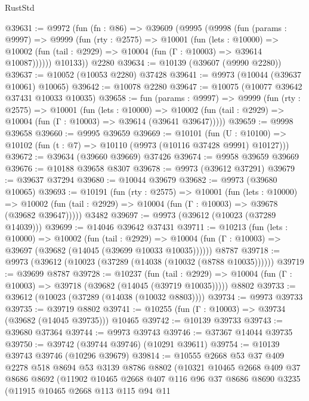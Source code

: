 \begin{lexlean}{RustStd}
\begin{coremodule}
@39631 := @9972
    (fun (fn : @86) =>
    @39609
      (@9995
        (@9998
          (fun (params : @9997) =>
          @9999
            (fun (rty : @2575) =>
            @10001
              (fun (lets : @10000) =>
              @10002 (fun (tail : @2929) => @10004 (fun (Γ : @10003) => @39614 @10087))))))
        @10133))
    @2280
@39634 := @10139 (@39607 (@9990 @2280))
@39637 := @10052 (@10053 @2280) @37428
@39641 := @9973 (@10044 (@39637 @10061) @10065)
@39642 := @10078 @2280
@39647 := @10075 (@10077 @39642 @37431 @10033 @10035)
@39658 := fun (params : @9997) =>
  @9999
    (fun (rty : @2575) =>
    @10001
      (fun (lets : @10000) =>
      @10002 (fun (tail : @2929) => @10004 (fun (Γ : @10003) => @39614 (@39641 @39647)))))
@39659 := @9998 @39658
@39660 := @9995 @39659
@39669 := @10101
    (fun (U : @10100) => @10102 (fun (t : @7) => @10110 (@9973 (@10116 @37428 @9991) @10127)))
@39672 := @39634 (@39660 @39669) @37426
@39674 := @9958 @39659 @39669
@39676 := @10188 @39658 @8307
@39678 := @9973 (@39612 @37291)
@39679 := @39637 @37294
@39680 := @10044 @39679
@39682 := @9973 (@39680 @10065)
@39693 := @10191
    (fun (rty : @2575) =>
    @10001
      (fun (lets : @10000) =>
      @10002 (fun (tail : @2929) => @10004 (fun (Γ : @10003) => @39678 (@39682 @39647)))))
    @3482
@39697 := @9973 (@39612 (@10023 (@37289 @14039)))
@39699 := @14046 @39642 @37431
@39711 := @10213
    (fun (lets : @10000) =>
    @10002
      (fun (tail : @2929) =>
      @10004 (fun (Γ : @10003) => @39697 (@39682 (@14045 (@39699 @10033 @10035))))))
    @8787
@39718 := @9973 (@39612 (@10023 (@37289 (@14038 (@10032 (@8788 @10035))))))
@39719 := @39699 @8787
@39728 := @10237
    (fun (tail : @2929) => @10004 (fun (Γ : @10003) => @39718 (@39682 (@14045 (@39719 @10035)))))
    @8802
@39733 := @39612 (@10023 (@37289 (@14038 (@10032 @8803))))
@39734 := @9973 @39733
@39735 := @39719 @8802
@39741 := @10255 (fun (Γ : @10003) => @39734 (@39682 (@14045 @39735))) @10465
@39742 := @10139 @39733
@39743 := @39680 @37364
@39744 := @9973 @39743
@39746 := @37367 @14044 @39735
@39750 := @39742 (@39744 @39746) (@10291 @39611)
@39754 := @10139 @39743 @39746 (@10296 @39679)
@39814 := @10555
    @2668
    @53
    @37
    @409
    @2278
    @518
    @8694
    @53
    @3139
    @8786
    @8802
    (@10321
      @10465
      @2668
      @409
      @37
      @8686
      @8692
      (@11902
        @10465
        @2668
        @407
        @116
        @96
        @37
        @8686
        @8690
        @3235
        (@11915
          @10465
          @2668
          @113
          @115
          @94
          @11

\end{coremodule}
\end{lexlean}
